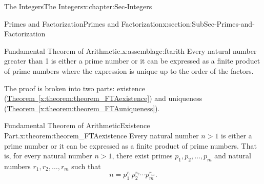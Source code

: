 \documentclass[oneside,10pt,]{book}
\newcommand{\xreffont}{\relax}
\numberwithin{equation}{section}
\begin{document}
\begin{chapterptx}{The Integers}{}{The Integers}{}{}{x:chapter:Sec-Integers}
\begin{sectionptx}{Primes and Factorization}{}{Primes and Factorization}{}{}{x:section:SubSec-Primes-and-Factorization}
\begin{assemblage}{Fundamental Theorem of Arithmetic.}{x:assemblage:ftarith}%
Every natural number greater than 1 is either a prime number or it can be expressed as a finite product of prime numbers where the expression is unique up to the order of the factors.%
\end{assemblage}
The proof is broken into two parts: existence (\hyperref[x:theorem:theorem_FTAexistence]{Theorem~{\xreffont\ref{x:theorem:theorem_FTAexistence}}}) and uniqueness (\hyperref[x:theorem:theorem_FTAuniqueness]{Theorem~{\xreffont\ref{x:theorem:theorem_FTAuniqueness}}}).%
\begin{theorem}{Fundamental Theorem of Arithmetic\textendash{}Existence Part\footnotemark{}.}{}{x:theorem:theorem_FTAexistence}%
Every natural number \(n > 1\) is either a prime number or it can be expressed as a finite product of prime numbers. That is, for every natural number \(n > 1\), there exist primes \(p_1, p_2, \ldots,
p_m\) and natural numbers \(r_1, r_2, \ldots, r_m\) such that%
\begin{equation*}
n = p_1^{r_1} p_2^{r_2} \cdots p_m^{r_m}\text{.}
\end{equation*}
%


\end{theorem}
\end{sectionptx}
\end{chapterptx}
\end{document}
